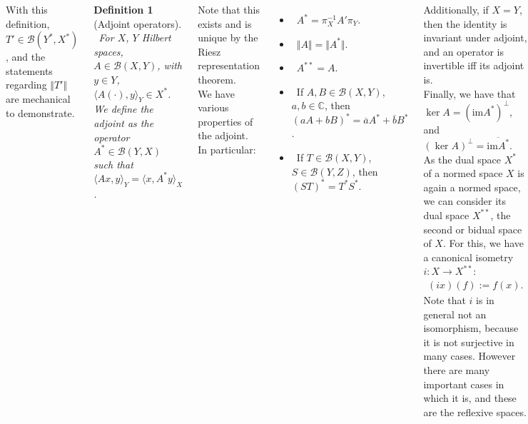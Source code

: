 \documentclass{tikzposter} %
\newtheorem{definition}{Definition}
\begin{document}
\begin{columns}
{      With this definition, $T' \in \mathcal{B}(Y^{*},X^{*})$, and the statements regarding $\Vert T' \Vert$ are mechanical to demonstrate. \\

      \begin{definition}[Adjoint operators]
      \ For $X$, $Y$ Hilbert spaces, $A \in \mathcal{B}(X,Y)$, with $y \in Y$, $\langle A(\cdot), y \rangle_{Y} \in X^{*}$. We define the adjoint as the operator $A^{*} \in \mathcal{B}(Y,X)$ such that $\langle Ax, y \rangle_{Y} = \langle x, A^{*}y \rangle_{X}$.
      \end{definition}
      \hphantom{}

      Note that this exists and is unique by the Riesz representation theorem. \\

      We have various properties of the adjoint. In particular:
      \begin{itemize}
              \item \ $A^{*} = \pi_{X}^{-1}A'\pi_{Y}$.
              \item \ $\Vert A \Vert = \Vert A^{*} \Vert$.
              \item \ $A^{**} = A$.
              \item \ If $A,B \in \mathcal{B}(X,Y)$, $a, b \in \mathbb{C}$, then $(aA+bB)^{*}=\overline{a}A^{*}+\overline{b}B^{*}$.
              \item \ If $T \in \mathcal{B}(X,Y)$, $S \in \mathcal{B}(Y,Z)$, then $(ST)^{*} = T^{*}S^{*}$.
      \end{itemize}
      \hphantom{}
      Additionally, if $X = Y$, then the identity is invariant under adjoint, and an operator is invertible iff its adjoint is. \\

      Finally, we have that $\ker A = (\mathrm{im} A^{*})^{\perp}$, and $(\ker A)^{\perp} = \overline{\mathrm{im} A^{*}}$. \\

      As the dual space $X^{*}$ of a normed space $X$ is again a normed space, we can consider its dual space $X^{**}$, the second or bidual space of $X$. For this, we have a canonical isometry $i : X \to X^{**}$:
      \begin{align*}
        (ix)(f) := f(x).
      \end{align*}
      Note that $i$ is in general not an isomorphism, because it is not surjective in many cases. However there are many important cases in which it is, and these are the reflexive spaces. \\

}
\end{columns}
\end{document}
